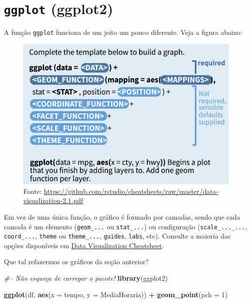 \documentclass[]{book}
\newenvironment{Shaded}{\begin{snugshade}}{\end{snugshade}}
\newcommand{\KeywordTok}[1]{\textcolor[rgb]{0.13,0.29,0.53}{\textbf{#1}}}
\newcommand{\DataTypeTok}[1]{\textcolor[rgb]{0.13,0.29,0.53}{#1}}
\newcommand{\DecValTok}[1]{\textcolor[rgb]{0.00,0.00,0.81}{#1}}
\newcommand{\StringTok}[1]{\textcolor[rgb]{0.31,0.60,0.02}{#1}}
\newcommand{\CommentTok}[1]{\textcolor[rgb]{0.56,0.35,0.01}{\textit{#1}}}
\newcommand{\OperatorTok}[1]{\textcolor[rgb]{0.81,0.36,0.00}{\textbf{#1}}}
\newcommand{\NormalTok}[1]{#1}
\theoremstyle{definition}
\theoremstyle{definition}
\theoremstyle{definition}
\theoremstyle{remark}
\begin{document}
\section{\texorpdfstring{\texttt{ggplot}
(ggplot2)}{ggplot (ggplot2)}}\label{ggplot-ggplot2}

A função \texttt{ggplot} funciona de um jeito um pouco diferente. Veja a
figura abaixo:

\begin{figure}
\centering
\includegraphics{figuras/ggplot_guide.png}
\caption{Fonte:
\url{https://github.com/rstudio/cheatsheets/raw/master/data-visualization-2.1.pdf}}
\end{figure}

Em vez de uma única função, o gráfico é formado por camadas, sendo que
cada camada é um elemento (\texttt{geom\_...} ou \texttt{stat\_...}) ou
configuração (\texttt{scale\_...\_...}, \texttt{coord\_...},
\texttt{theme} ou \texttt{theme\_...}, \texttt{guides}, \texttt{labs},
etc). Consulte a maioria das opções disponíveis em
\href{https://github.com/rstudio/cheatsheets/raw/master/data-visualization-2.1.pdf}{Data
Visualization Cheatsheet}.

Que tal refazermos os gráficos da seção anterior?

\begin{Shaded}
\begin{Highlighting}[]
\CommentTok{#-- Não esqueça de carregar o pacote!}
\KeywordTok{library}\NormalTok{(ggplot2)}
\end{Highlighting}
\end{Shaded}

\begin{Shaded}
\begin{Highlighting}[]
\KeywordTok{ggplot}\NormalTok{(df, }\KeywordTok{aes}\NormalTok{(}\DataTypeTok{x =}\NormalTok{ tempo, }\DataTypeTok{y =}\NormalTok{ MediaHoraria)) }\OperatorTok{+}
\StringTok{  }\KeywordTok{geom_point}\NormalTok{(}\DataTypeTok{pch =} \DecValTok{1}\NormalTok{)}
\end{Highlighting}
\end{Shaded}
\end{document}
